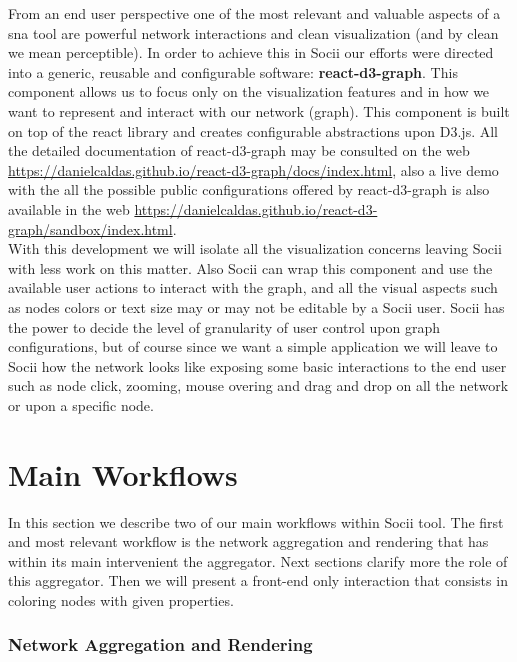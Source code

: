 From an end user perspective one of the most relevant and valuable aspects of a \gls{sna} tool are powerful network interactions and clean visualization (and by clean we mean perceptible). In order to achieve this in Socii our efforts were directed into a generic, reusable and configurable software: \textbf{react-d3-graph}\citep{reactd3graph}. This component allows us to focus only on the visualization features and in how we want to represent and interact with our network (graph). This component is built on top of the react library and creates configurable abstractions upon D3.js. All the detailed documentation of react-d3-graph
may be consulted on the web \citep{reactd3graph} \url{https://danielcaldas.github.io/react-d3-graph/docs/index.html}, also a live demo with the all the possible public configurations offered by react-d3-graph is also available in the web \url{https://danielcaldas.github.io/react-d3-graph/sandbox/index.html}.\\
With this development we will isolate all the visualization concerns leaving Socii with less work on this matter. Also Socii can wrap this component and use the available user actions to interact with the graph, and all the visual aspects such as nodes colors or text size may or may not be editable by a Socii user. Socii has the power to decide the level of granularity of user control upon graph configurations, but of course since we want a simple application we will leave to Socii how the network looks like exposing some basic interactions to the end user such as node click, zooming, mouse overing and drag and drop on all the network or upon a specific node.

\section{Main Workflows}

In this section we describe two of our main workflows within Socii tool. The first and most relevant workflow is the network aggregation and rendering that has within its main intervenient the aggregator. Next sections clarify more the role of this aggregator. Then we will present a front-end only interaction that consists in coloring nodes with given properties.

\subsubsection{Network Aggregation and Rendering}

